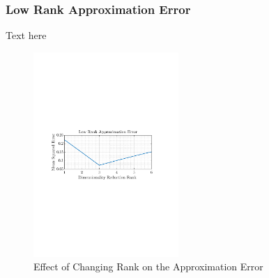 \documentclass[12pt]{article}
\begin{document}
 	\subsubsection{Low Rank Approximation Error}
 	Text here \\
	\begin{figure}
 		\vspace{-20pt}
 		\begin{centering}
 			\includegraphics[trim={2.2cm 11.2cm 3.15cm  11.2cm}, clip, width=0.49\textwidth]{../MATLAB/figures/q1_6b_fig01.pdf} 
 		\end{centering}
 		\captionsetup{justification=centering}
 		\caption{Effect of Changing Rank on the Approximation Error}
 		\label{fig: 1-6b}
 	\end{figure}

 	
\end{document}
